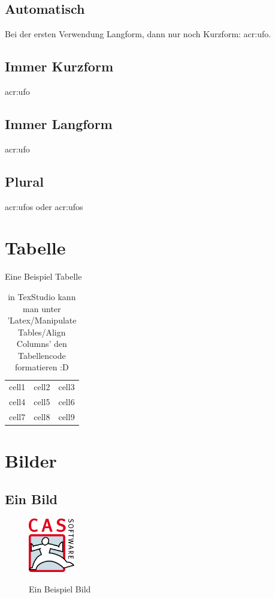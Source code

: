 \subsection{Automatisch}
Bei der ersten Verwendung Langform, dann nur noch Kurzform: \Ac{acr:ufo}.
\subsection{Immer Kurzform}
\acs{acr:ufo}
\subsection{Immer Langform}
\acf{acr:ufo}
\subsection{Plural}
\acsp{acr:ufo} oder \acfp{acr:ufo}

\section{Tabelle}
\begin{table}[H]
	\caption{Eine Beispiel Tabelle}
	\centering
	\begin{tabular}{ |c|c|c| } 
		\hline
		cell1 & cell2 & cell3 \\ 
		cell4 & cell5 & cell6 \\ 
		cell7 & cell8 & cell9 \\ 
		\hline
	\end{tabular}
	\label{Table:Beispiel}
	\caption[Meine Tabelle]{in TexStudio kann man unter 'Latex/Manipulate Tables/Align Columns' den Tabellencode formatieren :D}
\end{table}

\section{Bilder}
\subsection{Ein Bild}
\begin{figure}[H]
	\centering
	\includegraphics[width=2cm]{kapitel/0_offizielles/img/cas}
	\label{Image:Beispiel1}
	\caption{Ein Beispiel Bild}
\end{figure}

